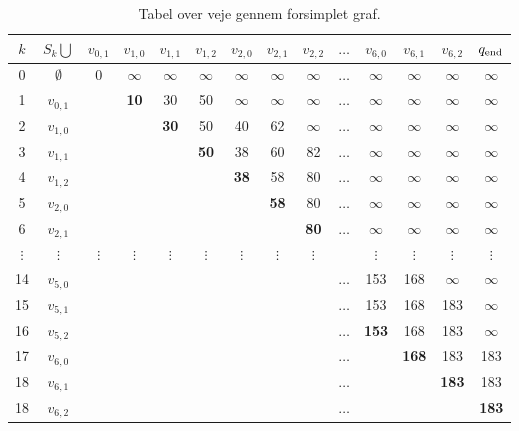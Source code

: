 \begin{table}[H]
\centering
\begin{tabular}{|c|c|c|c|c|c|c|c|c|c|c|c|c|c|} 
\hline
$k$ & $S_{k} \bigcup$ & $v_{0,1}$ & $v_{1,0}$ & $v_{1,1}$ & $v_{1,2}$ & $v_{2,0}$ & $v_{2,1}$ & $v_{2,2}$ & $\ldots$ & $v_{6,0}$ & $v_{6,1}$ & $v_{6,2}$ & $q_{\textrm{end}}$ \\
\hline
0 & $\emptyset$ & 0 & $\infty$ & $\infty$ & $\infty$ & $\infty$ & $\infty$ & $\infty$ & $\ldots$ & $\infty$ & $\infty$ & $\infty$ & $\infty$ \\ 
1 & $v_{0,1}$ & & \textbf{10} & 30 & 50 & $\infty$ & $\infty$ & $\infty$ & $\ldots$ & $\infty$ & $\infty$ & $\infty$ & $\infty$\\ 
2 & $v_{1,0}$ & & & \textbf{30} & 50 & 40 & 62 & $\infty$ & $\ldots$ & $\infty$ & $\infty$ & $\infty$ & $\infty$\\ 
3 & $v_{1,1}$ & & & & \textbf{50} & 38 & 60 & 82 & $\ldots$ & $\infty$ & $\infty$ & $\infty$ & $\infty$\\
4 & $v_{1,2}$ & & & & & \textbf{38} & 58 & 80 & $\ldots$ & $\infty$ & $\infty$ & $\infty$ & $\infty$\\ 
5 & $v_{2,0}$ & & & & & & \textbf{58} & 80 & $\ldots$ & $\infty$ & $\infty$ & $\infty$ & $\infty$\\ 
6 & $v_{2,1}$ & & & & & & & \textbf{80} & $\ldots$ & $\infty$ & $\infty$ & $\infty$ & $\infty$\\  
$\vdots$ & $\vdots$ & $\vdots$ & $\vdots$ & $\vdots$ & $\vdots$ & $\vdots$ & $\vdots$ & $\vdots$ &  & $\vdots$ & $\vdots$ & $\vdots$ & $\vdots$\\ 
14 & $v_{5,0}$ &  &  &  &  &  &  &  & $\ldots$ & 153 & 168 & $\infty$ & $\infty$\\ 
15 & $v_{5,1}$ &  &  &  &  &  &  &  & $\ldots$ & 153 & 168 & 183 & $\infty$\\ 
16 & $v_{5,2}$ &  &  &  &  &  &  &  & $\ldots$ & \textbf{153} & 168 & 183 & $\infty$\\ 
17 & $v_{6,0}$ &  &  &  &  &  &  &  & $\ldots$ &  & \textbf{168} & 183 & 183\\ 
18 & $v_{6,1}$ &  &  &  &  &  &  &  & $\ldots$ &  &  & \textbf{183} & 183\\ 
18 & $v_{6,2}$ &  &  &  &  &  &  &  & $\ldots$ &  &  &  & \textbf{183}\\ 
\hline
\end{tabular}
\caption{Tabel over veje gennem forsimplet graf.}
\label{table:forsimplet_graf}
\end{table}